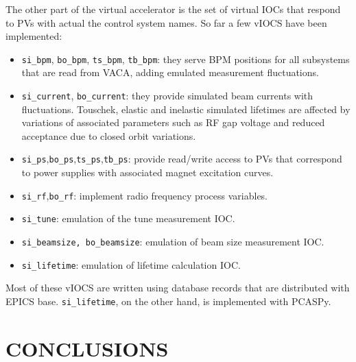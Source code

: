 \documentclass[a4paper,
              ]{jacow}
\begin{document}
The other part of the virtual accelerator is the set of virtual IOCs that respond to PVs with actual the control system names.
So far a few vIOCS have been implemented:
\begin{itemize}
\item \verb|si_bpm|, \verb|bo_bpm|, \verb|ts_bpm|, \verb|tb_bpm|: they serve BPM positions for all subsystems that are read from VACA, adding emulated measurement fluctuations.
\item \verb|si_current|, \verb|bo_current|: they provide simulated beam currents with fluctuations. Touschek, elastic and inelastic simulated lifetimes are affected by variations of associated parameters such as RF gap voltage and reduced acceptance due to closed orbit variations.
\item \verb|si_ps|,\verb|bo_ps|,\verb|ts_ps|,\verb|tb_ps|: provide read/write access to PVs that correspond to power supplies with associated magnet excitation curves.
\item \verb|si_rf|,\verb|bo_rf|: implement radio frequency process variables.
\item \verb|si_tune|: emulation of the tune measurement IOC.
\item \verb|si_beamsize, bo_beamsize|: emulation of beam size measurement IOC.
\item \verb|si_lifetime|: emulation of lifetime calculation IOC.
\end{itemize}
Most of these vIOCS are written using database records that are distributed with EPICS base.
\verb|si_lifetime|, on the other hand, is implemented with PCASPy.

\section{CONCLUSIONS}
\end{document}
